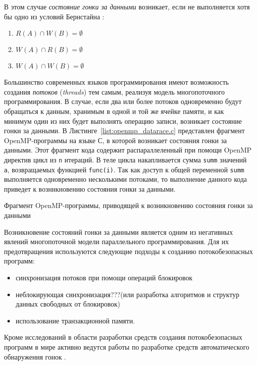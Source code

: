 В этом случае \textit{состояние гонки за данными} возникает, если не выполняется хотя бы одно из условий Бернстайна :
\begin{enumerate}
\item $R(A) \cap W(B) = \emptyset$
\item $W(A) \cap R(B) = \emptyset$
\item $W(A) \cap W(B) = \emptyset$
\end{enumerate}

Большинство современных языков программирования имеют возможность создания \textit{потоков} (\textit{threads}) тем самым, реализуя модель многопоточного программирования. В случае, если два или более потоков одновременно будут обращаться к данным, хранимым в одной и той же ячейке памяти, и как минимум один из них будет выполнять операцию записи, возникает состояние гонки за данными. В Листинге~\ref{list:openmp_datarace.c} представлен фрагмент OpenMP-программы на языке С, в которой возникает состояния гонки за данными. Этот фрагмент кода содержит распараллеленный при помощи OpenMP директив цикл из \texttt{n} итераций. В теле цикла накапливается сумма \texttt{summ} значений \texttt{a}, возвращаемых функцией \texttt{func(i)}. Так как доступ к общей переменной \texttt{summ} выполняется одновременно несколькими потоками, то выполнение данного кода приведет к возникновению состояния гонки за данными.

\begin{ListingEnv}[!h]
	
    \caption{Фрагмент OpenMP-программы, приводящей к возникновению состояния гонки за данными}
    \label{list:openmp_datarace.c}
\end{ListingEnv}

Возникновение состояний гонки за данными является одним из негативных явлений многопоточной модели параллельного программирования. Для их предотвращения используются следующие подходы к созданию потокобезопасных программ:
\begin{itemize}
\item синхронизация потоков при помощи операций блокировок 
\item неблокирующая синхронизация???(или разработка алгоритмов и структур данных свободных от блокировок) 
\item использование транзакционной памяти. 
\end{itemize}
Кроме исследований в области разработки средств создания потокобезопасных программ в мире активно ведутся работы по разработке средств автоматического обнаружения гонок .

